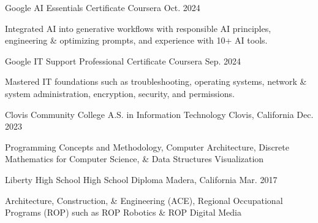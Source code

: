 \begin{cventries}
	\cventry
	{Google} %
	{AI Essentials Certificate} %
	{Coursera} %
	{Oct. 2024} %
	{
		\begin{cvitems} %
		\item{Integrated AI into generative workflows with responsible AI principles, engineering \& optimizing prompts, and experience with 10+ AI tools.}
		\end{cvitems}
	}

	\cventry
	{Google} %
	{IT Support Professional Certificate} %
	{Coursera} %
	{Sep. 2024} %
	{
		\begin{cvitems} %
		\item{Mastered IT foundations such as troubleshooting, operating systems, network \& system administration, encryption, security, and permissions.}
		\end{cvitems}
	}

	\cventry
	{Clovis Community College} %
	{A.S. in Information Technology} %
	{Clovis, California} %
	{Dec. 2023} %
	{
		\begin{cvitems} %
		\item{Programming Concepts and Methodology, Computer Architecture, Discrete Mathematics for Computer Science, \& Data Structures Visualization}
		\end{cvitems}
	}

	\cventry
	  {Liberty High School} %
	  {High School Diploma} %
	  {Madera, California} %
	  {Mar. 2017} %
	  {
	    \begin{cvitems} %
	\item {Architecture, Construction, \& Engineering (ACE), Regional Occupational Programs (ROP) such as ROP Robotics \& ROP Digital Media}
	    \end{cvitems}
	  }
\end{cventries}

